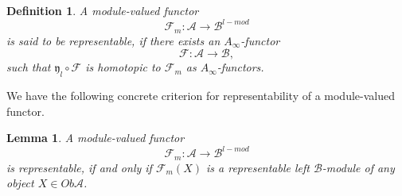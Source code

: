 \documentclass{amsart}
\newtheorem{definition}[theorem]{Definition}
\newtheorem{lemma}[theorem]{Lemma}
\numberwithin{equation}{section}
\numberwithin{figure}{section}
\begin{document}
\begin{definition}
	A module-valued functor
\begin{equation*}
\mathcal{F}_{m}: \mathcal{A} \to \mathcal{B}^{l-mod}
\end{equation*}
is said to be representable, if there exists an $A_{\infty}$-functor
\begin{equation}
\mathcal{F}: \mathcal{A} \to \mathcal{B},
\end{equation}
such that $\mathfrak{y}_{l} \circ \mathcal{F}$ is homotopic to $\mathcal{F}_{m}$ as $A_{\infty}$-functors.
\end{definition}

	We have the following concrete criterion for representability of a module-valued functor. \par 

\begin{lemma}\label{criterion for representability in terms of objects}
	A module-valued functor
\begin{equation*}
\mathcal{F}_{m}: \mathcal{A} \to \mathcal{B}^{l-mod}
\end{equation*}
is representable, if and only if $\mathcal{F}_{m}(X)$ is a representable left $\mathcal{B}$-module of any object $X \in Ob\mathcal{A}$.
\end{lemma}
\end{document}
